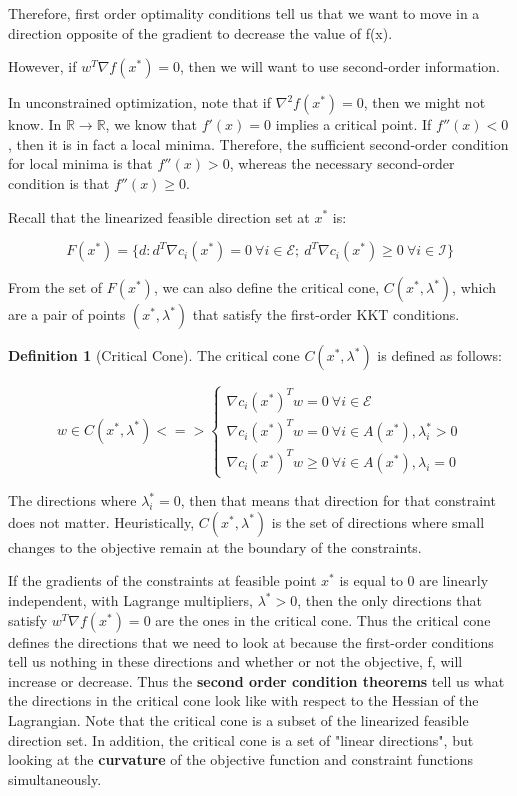 \documentclass[class=article, crop=false]{standalone}
\theoremstyle{definition}
\newtheorem{definition}{Definition}[section]
\theoremstyle{remark}
\theoremstyle{lemma}
\theoremstyle{theorem}
\theoremstyle{corollary}
\theoremstyle{property}
\begin{document}
			Therefore, first order optimality conditions tell us that we want to move in a direction opposite of the gradient to decrease the value of f(x).

			However, if $w^T \nabla f(x^*) = 0$, then we will want to use second-order information. 

			In unconstrained optimization, note that if $\nabla^2 f(x^*) = 0$, then we might not know. In $\mathbb{R} \rightarrow \mathbb{R}$, we know that $f'(x) = 0$ implies a critical point. If $f''(x) < 0$, then it is in fact a local minima. Therefore, the sufficient second-order condition for local minima is that $f''(x) > 0$, whereas the necessary second-order condition is that $f''(x) \ge 0$.

			Recall that the linearized feasible direction set at $x^*$ is:

				$$F(x^*) = \{d : d^T \nabla c_i(x^*) = 0\ \forall i \in \mathcal{E};\ d^T \nabla c_i(x^*) \ge 0\ \forall i \in \mathcal{I}\}$$

			From the set of $F(x^*)$, we can also define the critical cone, $C(x^*, \lambda^*)$, which are a pair of points $(x^*, \lambda^*)$ that satisfy the first-order KKT conditions.

			\begin{definition} [Critical Cone]
				The critical cone $C(x^*, \lambda^*)$ is defined as follows:

				\begin{equation}
				w \in C(x^*, \lambda^*) <=> \begin{cases} 
				\nabla c_i(x^*)^T w = 0 \ \forall i \in \mathcal{E} \\
				\nabla c_i(x^*)^T w = 0 \ \forall i \in A(x^*), \lambda^*_i > 0 \\
				\nabla c_i(x^*)^T w \ge 0 \ \forall i \in A(x^*), \lambda_i = 0
				\end{cases}
				\end{equation}
			\end{definition}

			The directions where $\lambda_i^* = 0$, then that means that direction for that constraint does not matter. Heuristically, $C(x^*, \lambda^*)$ is the set of directions where small changes to the objective remain at the boundary of the constraints.

			If the gradients of the constraints at feasible point $x^*$ is equal to 0 are linearly independent, with Lagrange multipliers, $\lambda^* > 0$, then the only directions that satisfy $w^T \nabla f(x^*) = 0$ are the ones in the critical cone. Thus the critical cone defines the directions that we need to look at because the first-order conditions tell us nothing in these directions and whether or not the objective, f, will increase or decrease. Thus the \textbf{second order condition theorems} tell us what the directions in the critical cone look like with respect to the Hessian of the Lagrangian. Note that the critical cone is a subset of the linearized feasible direction set. In addition, the critical cone is a set of "linear directions", but looking at the \textbf{curvature} of the objective function and constraint functions simultaneously.
\end{document}
